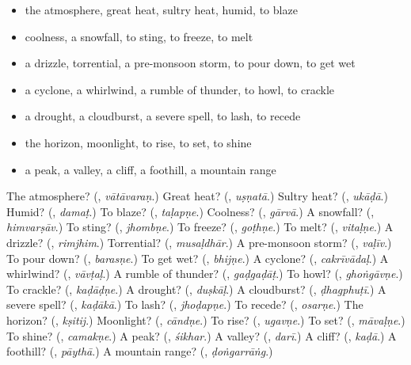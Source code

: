 \begin{itemize}
\raggedright
  \item the atmosphere, great heat, sultry heat, humid, to blaze
  \item coolness, a snowfall, to sting, to freeze, to melt
  \item a drizzle, torrential, a pre-monsoon storm, to pour down, to get wet
  \item a cyclone, a whirlwind, a rumble of thunder, to howl, to crackle
  \item a drought, a cloudburst, a severe spell, to lash, to recede
  \item the horizon, moonlight, to rise, to set, to shine
  \item a peak, a valley, a cliff, a foothill, a mountain range
\end{itemize}

\begin{tcolorbox}[breakable,colback=teal!4,colframe=teal!35!black,title={Before you move on}]
The atmosphere? (\textbf{}, \emph{vātāvaraṇ}.) Great heat? (\textbf{}, \emph{uṣṇatā}.) Sultry heat? (\textbf{}, \emph{ukāḍā}.) Humid? (\textbf{}, \emph{damaṭ}.) To blaze? (\textbf{}, \emph{taḷapṇe}.) Coolness? (\textbf{}, \emph{gārvā}.) A snowfall? (\textbf{}, \emph{himvarṣāv}.) To sting? (\textbf{}, \emph{jhombṇe}.) To freeze? (\textbf{}, \emph{goṭhṇe}.) To melt? (\textbf{}, \emph{vitaḷṇe}.) A drizzle? (\textbf{}, \emph{rimjhim}.) Torrential? (\textbf{}, \emph{musaḷdhār}.) A pre-monsoon storm? (\textbf{}, \emph{vaḷīv}.) To pour down? (\textbf{}, \emph{barasṇe}.) To get wet? (\textbf{}, \emph{bhijṇe}.) A cyclone? (\textbf{}, \emph{cakrīvādaḷ}.) A whirlwind? (\textbf{}, \emph{vāvṭaḷ}.) A rumble of thunder? (\textbf{}, \emph{gaḍgaḍāṭ}.) To howl? (\textbf{}, \emph{ghoṅgāvṇe}.) To crackle? (\textbf{}, \emph{kaḍāḍṇe}.) A drought? (\textbf{}, \emph{duṣkāḷ}.) A cloudburst? (\textbf{}, \emph{ḍhagphuṭī}.) A severe spell? (\textbf{}, \emph{kaḍākā}.) To lash? (\textbf{}, \emph{jhoḍapṇe}.) To recede? (\textbf{}, \emph{osarṇe}.) The horizon? (\textbf{}, \emph{kṣitij}.) Moonlight? (\textbf{}, \emph{cāndṇe}.) To rise? (\textbf{}, \emph{ugavṇe}.) To set? (\textbf{}, \emph{māvaḷṇe}.) To shine? (\textbf{}, \emph{camakṇe}.) A peak? (\textbf{}, \emph{śikhar}.) A valley? (\textbf{}, \emph{darī}.) A cliff? (\textbf{}, \emph{kaḍā}.) A foothill? (\textbf{}, \emph{pāythā}.) A mountain range? (\textbf{}, \emph{ḍoṅgarrāṅg}.)
\end{tcolorbox}

